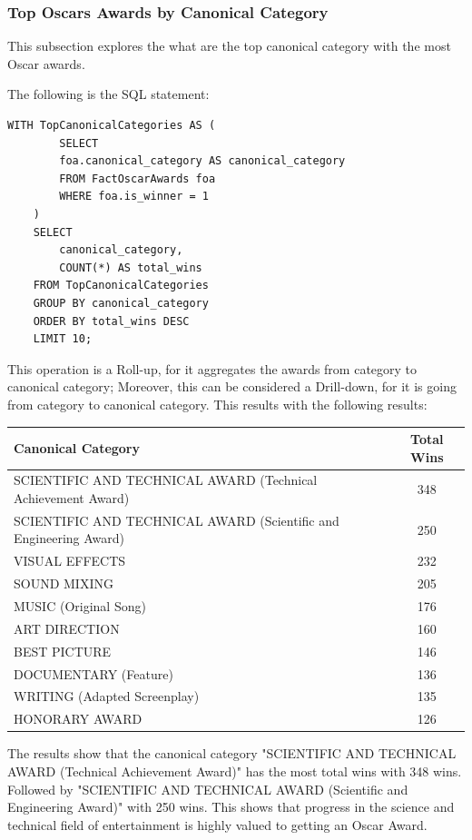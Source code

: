 \subsubsection{Top Oscars Awards by Canonical Category}

This subsection explores the what are the top canonical category with the most Oscar awards. 

The following is the SQL statement:
\begin{lstlisting}[style=SQLStyle]
	WITH TopCanonicalCategories AS (
		SELECT
		foa.canonical_category AS canonical_category
		FROM FactOscarAwards foa
		WHERE foa.is_winner = 1
	)
	SELECT
		canonical_category,
		COUNT(*) AS total_wins
	FROM TopCanonicalCategories
	GROUP BY canonical_category
	ORDER BY total_wins DESC
	LIMIT 10;
\end{lstlisting}

This operation is a Roll-up, for it aggregates the awards from category to canonical category; Moreover, this can be considered a Drill-down, for it is going from category to canonical category. This results with the following results:

\begin{center}
	\begin{tabular}{|p{5cm}|c|}
		\hline
		\textbf{Canonical Category} & \textbf{Total Wins} \\
		\hline
		SCIENTIFIC AND TECHNICAL AWARD (Technical Achievement Award) & 348 \\
		SCIENTIFIC AND TECHNICAL AWARD (Scientific and Engineering Award) & 250 \\
		VISUAL EFFECTS & 232 \\
		SOUND MIXING & 205 \\
		MUSIC (Original Song) & 176 \\
		ART DIRECTION & 160 \\
		BEST PICTURE & 146 \\
		DOCUMENTARY (Feature) & 136 \\
		WRITING (Adapted Screenplay) & 135 \\
		HONORARY AWARD & 126 \\
		\hline
	\end{tabular}
\end{center}

The results show that the canonical category "SCIENTIFIC AND TECHNICAL AWARD (Technical Achievement Award)" has the most total wins with 348 wins. Followed by "SCIENTIFIC AND TECHNICAL AWARD (Scientific and Engineering Award)" with 250 wins. This shows that progress in the science and technical field of entertainment is highly valued to getting an Oscar Award.

